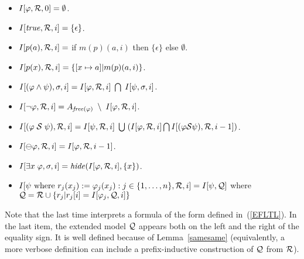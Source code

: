 \documentclass{llncs}
\begin{document}
\begin{itemize}
\item $I [ \varphi , {\cal R} , 0 ] = \emptyset$.
\item $I [ \mathit{true} , {\cal R} , i ] = \{ \epsilon \}$.
\item $I [ p ( a ) , {\cal R} , i ] =$ if $m (p )  ( a , i ) $ then
$\{ \epsilon \}$ else $\emptyset$.
\item $I [ p ( x ) , {\cal R} , i ] = \{ [ x \mapsto a ] | m (p) ( a , i)  \}$.
\item $I [ ( \varphi \wedge \psi ) , \sigma , i ] = 
I [ \varphi , {\cal R} , i ] \;  \bigcap \; I [ \psi , \sigma , i ]$.
\item $I [ \neg \varphi , {\cal R} , i ] = 
A_{\mathit{free} ( \varphi )} \; \setminus \; I [ \varphi , {\cal R} , i ]$.
\item $I [ ( \varphi \; {\cal S} \; \psi ) , {\cal R} , i ] = 
I [ \psi , {\cal R}, i ] \; \bigcup \;
( I [ \varphi , {\cal R} , i ] \bigcap 
I [ (\varphi {\cal S} \psi ) , {\cal R} , i - 1 ] )$.
\item $I [ \ominus \varphi , {\cal R} , i ] = I [ \varphi , {\cal R} , i-1 ]$.
\item $I [ \exists x \; \varphi , \sigma , i ] = 
\mathit{hide} ( I [ \varphi , {\cal R} , i ] , \{ x \} )$.
\item $I [ \psi \mathrm{\ where\ } r_j ( x_j) := 
\varphi_j (x_j) : j \in \{ 1 , \ldots , n \} , {\cal R} , i ] = 
 I [ \psi , {\cal Q} ] $ where ${\cal Q} = {\cal R} \cup
\{ r_j | r_j [ i ] =  I [ 
\varphi_j , {\cal Q} , i ] \}$
\end{itemize}
Note that the last time interprets a formula of
the form defined in~(\ref{EFLTL}).
In the last item, the extended model ${\cal Q}$ appears both on the left and the right of the equality sign. It is well defined because of Lemma~\ref{samesame} (equivalently, a more verbose definition can include a prefix-inductive construction of ${\cal Q}$ from ${\cal R}$).
\end{document}
